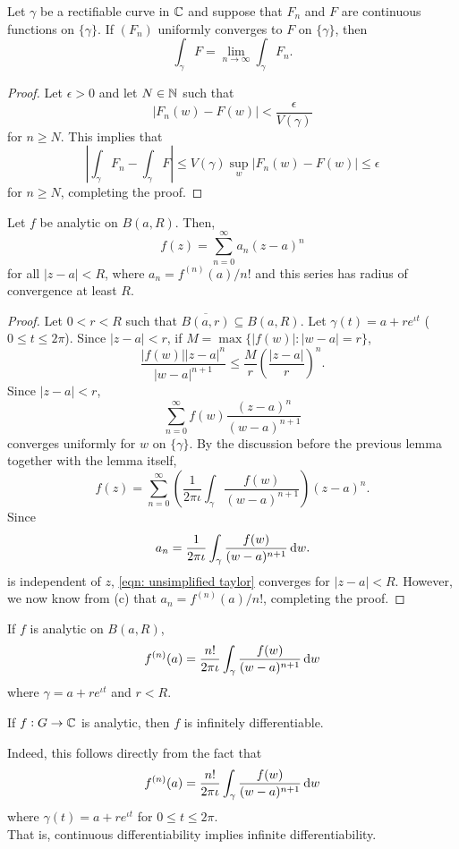 	\begin{lemma}
		Let $\gamma$ be a rectifiable curve in $\mathbb{C}$ and suppose that $F_n$ and $F$ are continuous functions on $\{\gamma\}$. If $(F_n)$ uniformly converges to $F$ on $\{\gamma\}$, then
		\[ \int_\gamma F = \lim_{n\to\infty} \int_\gamma F_n. \]
	\end{lemma}
	\begin{proof}
		Let $\epsilon > 0$ and let $N \in \mathbb{N}$ such that
		\[ |F_n(w) - F(w)| < \frac{\epsilon}{V(\gamma)} \]
		for $n \ge N$. This implies that
		\[ \left| \int_\gamma F_n - \int_\gamma F \right| \le V(\gamma) \sup_{w} |F_n(w) - F(w)| \le \epsilon \]
		for $n \ge N$, completing the proof.
	\end{proof}

	\begin{ftheo}
		Let $f$ be analytic on $B(a,R)$. Then,
		\[ f(z) = \sum_{n=0}^\infty a_n(z-a)^n \]
		for all $|z-a| < R$, where $a_n = f^{(n)}(a)/n!$ and this series has radius of convergence at least $R$.
	\end{ftheo}
	\begin{proof}
		Let $0 < r < R$ such that $\overline{B(a,r)} \subseteq B(a,R)$. Let $\gamma(t) = a + re^{\iota t}$ ($0\le t\le 2\pi$). Since $|z-a| < r$, if $M = \max\{|f(w)| : |w-a| = r\}$,
		\[ \frac{|f(w)||z-a|^n}{|w-a|^{n+1}} \le \frac{M}{r} \left( \frac{|z-a|}{r} \right)^n. \]
		Since $|z-a| < r$,
		\[ \sum_{n=0}^{\infty} f(w) \frac{(z-a)^n}{(w-a)^{n+1}} \]
		converges uniformly for $w$ on $\{\gamma\}$. By the discussion before the previous lemma together with the lemma itself,
		\begin{equation}
			\label{eqn: unsimplified taylor}
			\tag{$*$}
			f(z) = \sum_{n=0}^{\infty} \left(\frac{1}{2\pi\iota} \int_\gamma \frac{f(w)}{(w-a)^{n+1}}\right) (z-a)^n.
		\end{equation}
		Since
		\[ a_n = \frac{1}{2\pi\iota} \int_\gamma \frac{f(w)}{(w-a)^{n+1}} \dif w. \]
		is independent of $z$, \eqref{eqn: unsimplified taylor} converges for $|z-a| < R$. However, we now know from (c) that $a_n = f^{(n)}(a)/n!$, completing the proof.
	\end{proof}

	\begin{corollary}
		If $f$ is analytic on $B(a,R)$,
		\[ f^{(n)}(a) = \frac{n!}{2\pi\iota} \int_\gamma \frac{f(w)}{(w-a)^{n+1}} \dif w \]
		where $\gamma = a + re^{\iota t}$ and $r < R$.
	\end{corollary}

	\begin{corollary}
		If $f:G\to\mathbb{C}$ is analytic, then $f$ is infinitely differentiable.
	\end{corollary}
	Indeed, this follows directly from the fact that
	\[ f^{(n)}(a) = \frac{n!}{2\pi\iota} \int_\gamma \frac{f(w)}{(w-a)^{n+1}} \dif w \]
	where $\gamma(t) = a+re^{\iota t}$ for $0 \le t \le 2\pi$.\\
	That is, continuous differentiability implies infinite differentiability.

